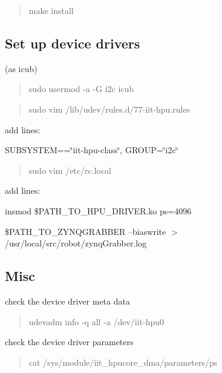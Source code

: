 \begin{quote}
make install \end{quote}


\subsection*{Set up device drivers}

(as icub)

\begin{quote}
sudo usermod -\/a -\/G i2c icub \end{quote}


\begin{quote}
sudo vim /lib/udev/rules.d/77-\/iit-\/hpu.\+rules \end{quote}


add lines\+:


\begin{DoxyItemize}
\item S\+U\+B\+S\+Y\+S\+T\+EM==\char`\"{}iit-\/hpu-\/class\char`\"{}, G\+R\+O\+UP=\char`\"{}i2c\char`\"{}
\end{DoxyItemize}

\begin{quote}
sudo vim /etc/rc.local \end{quote}


add lines\+:


\begin{DoxyItemize}
\item insmod \$\+P\+A\+T\+H\+\_\+\+T\+O\+\_\+\+H\+P\+U\+\_\+\+D\+R\+I\+V\+E\+R.\+ko ps=4096
\item \$\+P\+A\+T\+H\+\_\+\+T\+O\+\_\+\+Z\+Y\+N\+Q\+G\+R\+A\+B\+B\+ER --biaswrite $>$ /usr/local/src/robot/zynq\+Grabber.log
\end{DoxyItemize}

\subsection*{Misc}

check the device driver meta data

\begin{quote}
udevadm info -\/q all -\/a /dev/iit-\/hpu0 \end{quote}


check the device driver parameters

\begin{quote}
cat /sys/module/iit\+\_\+hpucore\+\_\+dma/parameters/ps\end{quote}
